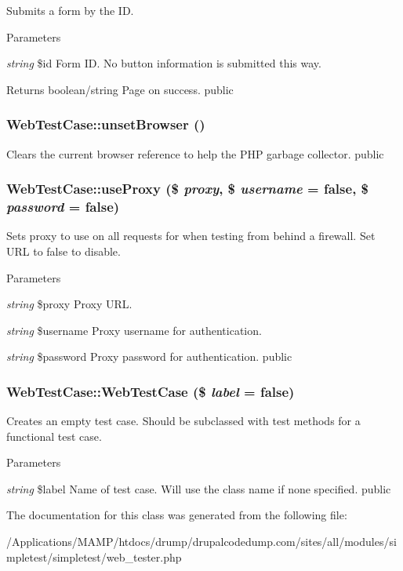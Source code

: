 \label{class_web_test_case_addbc36aa63cbd70458383bc2fae78c03}
Submits a form by the ID. 
\begin{DoxyParams}{Parameters}
\item[{\em string}]\$id Form ID. No button information is submitted this way. \end{DoxyParams}
\begin{DoxyReturn}{Returns}
boolean/string Page on success.  public 
\end{DoxyReturn}
\hypertarget{class_web_test_case_a7ed6a5b76724d578d6f66a15945651ab}{
\subsubsection[{unsetBrowser}]{\setlength{\rightskip}{0pt plus 5cm}WebTestCase::unsetBrowser ()}}
\label{class_web_test_case_a7ed6a5b76724d578d6f66a15945651ab}
Clears the current browser reference to help the PHP garbage collector.  public \hypertarget{class_web_test_case_aa05541e229c6ef1b31a51028cf08c92d}{
\subsubsection[{useProxy}]{\setlength{\rightskip}{0pt plus 5cm}WebTestCase::useProxy (\$ {\em proxy}, \/  \$ {\em username} = {\ttfamily false}, \/  \$ {\em password} = {\ttfamily false})}}
\label{class_web_test_case_aa05541e229c6ef1b31a51028cf08c92d}
Sets proxy to use on all requests for when testing from behind a firewall. Set URL to false to disable. 
\begin{DoxyParams}{Parameters}
\item[{\em string}]\$proxy Proxy URL. \item[{\em string}]\$username Proxy username for authentication. \item[{\em string}]\$password Proxy password for authentication.  public \end{DoxyParams}
\hypertarget{class_web_test_case_af4f14d8dd0bc743ea15308261b859f50}{
\subsubsection[{WebTestCase}]{\setlength{\rightskip}{0pt plus 5cm}WebTestCase::WebTestCase (\$ {\em label} = {\ttfamily false})}}
\label{class_web_test_case_af4f14d8dd0bc743ea15308261b859f50}
Creates an empty test case. Should be subclassed with test methods for a functional test case. 
\begin{DoxyParams}{Parameters}
\item[{\em string}]\$label Name of test case. Will use the class name if none specified.  public \end{DoxyParams}


The documentation for this class was generated from the following file:\begin{DoxyCompactItemize}
\item 
/Applications/MAMP/htdocs/drump/drupalcodedump.com/sites/all/modules/simpletest/simpletest/web\_\-tester.php\end{DoxyCompactItemize}
